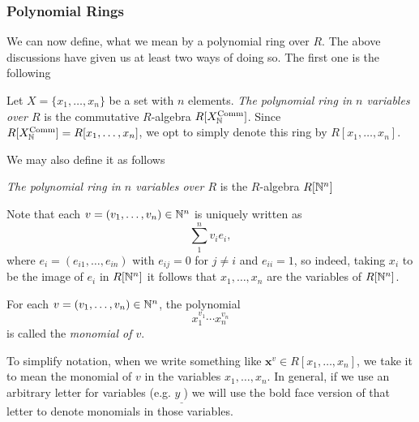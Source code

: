 \subsubsection{Polynomial Rings}
    We can now define, what we mean by a polynomial ring over $R$. The above discussions have given us at least two ways of doing so. The first one is the following 
    \begin{definition}
        Let $X=\{x_1,\dots,x_n\}$ be a set with $n$ elements. \emph{The polynomial ring in $n$ variables over $R$} is the commutative $R$-algebra $R[X_{\mathbb{N}}^\mathrm{Comm}]$. Since $R[X_{\mathbb{N}}^\mathrm{Comm}] = R[x_1,\dots,x_n]$, we opt to simply denote this ring by $R[x_1,\dots,x_n]$.
    \end{definition} 
    We may also define it as follows 
    \begin{definition}
        \emph{The polynomial ring in $n$ variables over $R$} is the $R$-algebra $R[\mathbb{N}^n]$
    \end{definition}
    Note that each $v = (v_1,\dots,v_n)\in \mathbb{N}^n$ is uniquely written as 
    $$
        \sum_1^n v_i e_i,
    $$
    where $e_i=(e_{i1},\dots,e_{in})$ with $e_{ij}=0$ for $j\neq i$ and $e_{ii}=1$, so indeed, taking $x_i$ to be the image of $e_i$ in $R[\mathbb{N}^n]$ it follows that $x_1,\dots,x_n$ are the variables of $R[\mathbb{N}^n]$.
    \begin{definition}
        For each $v=(v_1,\dots,v_n)\in \mathbb{N}^n$, the polynomial 
        $$
            x_1^{v_1}\cdots x_n^{v_n}
        $$
        is called the \emph{monomial of $v$}.
    \end{definition}
    To simplify notation, when we write something like $\mathbf{x}^v\in R[x_1,\dots,x_n]$, we take it to mean the monomial of $v$ in the variables $x_1,\dots,x_n$. In general, if we use an arbitrary letter for variables (e.g. $y_{\_}$) we will use the bold face version of that letter to denote monomials in those variables.
